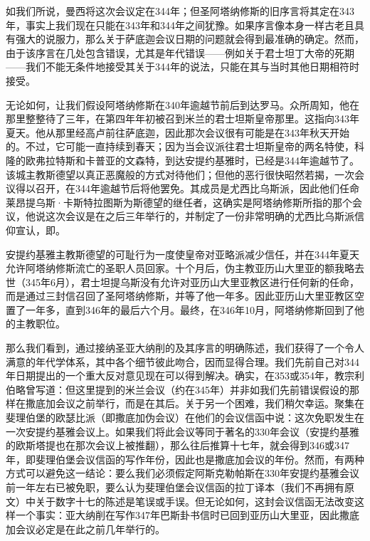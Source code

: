 如我们所说，曼西将这次会议定在344年；但圣阿塔纳修斯的旧序言将其定在343年，事实上我们现在只能在343年和344年之间犹豫。如果序言像本身一样古老且具有强大的说服力，那么关于萨底迦会议日期的问题就会得到最准确的确定。然而，由于该序言在几处包含错误，尤其是年代错误——例如关于君士坦丁大帝的死期——我们不能无条件地接受其关于344年的说法，只能在其与当时其他日期相符时接受。\par

无论如何，让我们假设阿塔纳修斯在340年逾越节前后到达罗马。众所周知，他在那里整整待了三年，在第四年年初被召到米兰的君士坦斯皇帝那里。这指向343年夏天。他从那里经高卢前往萨底迦，因此那次会议很有可能是在343年秋天开始的。不过，它可能一直持续到春天；因为当会议派往君士坦斯皇帝的两名特使，科隆的欧弗拉特斯和卡普亚的文森特，到达安提约基雅时，已经是344年逾越节了。该城主教斯德望以真正恶魔般的方式对待他们；但他的恶行很快昭然若揭，一次会议得以召开，在344年逾越节后将他罢免。其成员是尤西比乌斯派，因此他们任命莱昂提乌斯·卡斯特拉图斯为斯德望的继任者，这确实是阿塔纳修斯所指的那个会议，他说这次会议是在之后三年举行的，并制定了一份非常明确的尤西比乌斯派信仰宣认，即。\par

安提约基雅主教斯德望的可耻行为一度使皇帝对亚略派减少信任，并在344年夏天允许阿塔纳修斯流亡的圣职人员回家。十个月后，伪主教亚历山大里亚的额我略去世（345年6月），君士坦提乌斯没有允许对亚历山大里亚教区进行任何新的任命，而是通过三封信召回了圣阿塔纳修斯，并等了他一年多。因此亚历山大里亚教区空置了一年多，直到346年的最后六个月。最终，在346年10月，阿塔纳修斯回到了他的主教职位。\par

那么我们看到，通过接纳圣亚大纳削的及其序言的明确陈述，我们获得了一个令人满意的年代学体系，其中各个细节彼此吻合，因而显得合理。我们先前自己对344年日期提出的一个重大反对意见现在可以得到解决。确实，在353或354年，教宗利伯略曾写道：但这里提到的米兰会议（约在345年）并非如我们先前错误假设的那样在撒底加会议之前举行，而是在其后。关于另一个困难，我们稍欠幸运。聚集在斐理伯堡的欧瑟比派（即撒底加伪会议）在他们的会议信函中说：这次免职发生在一次安提约基雅会议上。如果我们将此会议等同于著名的330年会议（安提约基雅的欧斯塔提也在那次会议上被推翻），那么往后推算十七年，就会得到346或347年，即斐理伯堡会议信函的写作年份，因此也是撒底加会议的年份。然而，有两种方式可以避免这一结论：要么我们必须假定阿斯克勒帕斯在330年安提约基雅会议前一年左右已被免职，要么认为斐理伯堡会议信函的拉丁译本（我们不再拥有原文）中关于数字十七的陈述是笔误或手误。但无论如何，这封会议信函无法改变这样一个事实：亚大纳削在写作347年巴斯卦书信时已回到亚历山大里亚，因此撒底加会议必定是在此之前几年举行的。\par

